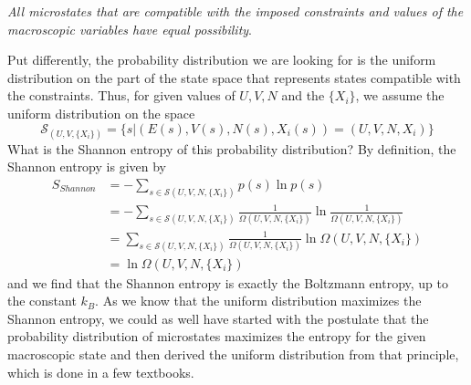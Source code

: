 \documentclass[a4paper, draft]{report}
\numberwithin{section}{chapter}
\numberwithin{equation}{chapter}
\theoremstyle{own}
\theoremstyle{remark}
\begin{document}
{\em All microstates that are compatible with the imposed constraints and values of the macroscopic variables have equal possibility}. 

Put differently, the probability distribution we are looking for is the uniform distribution on the part of the state space that represents states compatible with the constraints. Thus, for given values of $U,V,N$ and the $\{ X_i\}$, we assume the uniform distribution on the space
$$
{\mathcal S}_{(U,V, \{ X_i\})} = \{ s | (E(s), V(s), N(s), X_i(s)) = (U,V,N,X_i)\}
$$
What is the Shannon entropy of this probability distribution? By definition, the Shannon entropy is given by
\begin{align*}
S_{Shannon} &= - \sum_{s \in {\mathcal S}(U,V,N, \{X_i\})} p(s) \ln p(s) \\
&= - \sum_{s \in {\mathcal S}(U,V,N, \{X_i\})} \frac{1}{\Omega(U,V,N, \{X_i\})} 
\ln \frac{1}{\Omega(U,V,N, \{X_i\})} \\
&= \sum_{s \in {\mathcal S}(U,V,N, \{X_i\})} \frac{1}{\Omega(U,V,N, \{X_i\})}  
\ln \Omega(U,V,N, \{X_i\}) \\& = \ln \Omega(U,V,N, \{X_i\}) 
\end{align*}
and we find that the Shannon entropy is exactly the Boltzmann entropy, up to the constant $k_B$. As we know that the uniform distribution maximizes the Shannon entropy, we could as well have started with the postulate that the probability distribution of microstates maximizes the entropy for the given macroscopic state and then derived the uniform distribution from that principle, which is done in a few textbooks.
\end{document}
